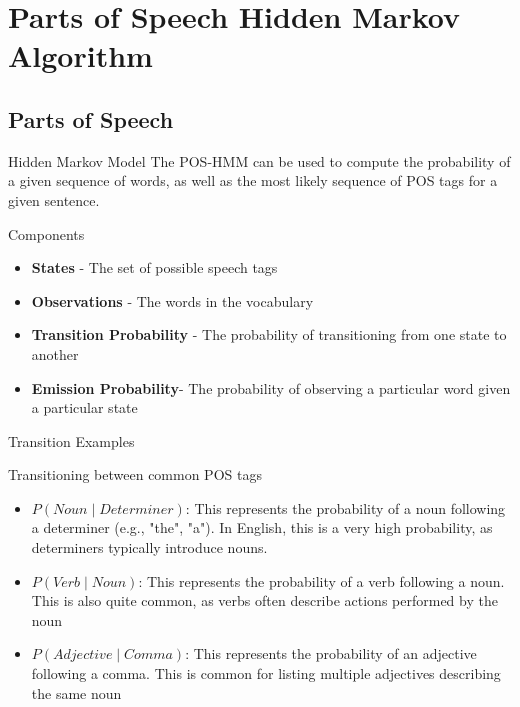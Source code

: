 
    \section{Parts of Speech Hidden Markov Algorithm}
    \subsection{Parts of Speech}
    \begin{frame}{Hidden Markov Model}
       The POS-HMM can be used to compute the probability of a given sequence of words, as well as the most likely sequence of POS tags for a given sentence.

       \begin{block}{Components}
            \begin{itemize}
                \item \textbf{States} - The set of possible speech tags
                \item \textbf{Observations} - The words in the vocabulary
                \item \textbf{Transition Probability} - The probability of transitioning from one state to another
                \item \textbf{Emission Probability}- The probability of observing a particular word given a particular state
            \end{itemize}
       \end{block}
       \end{frame}

       \begin{frame}{Transition Examples}
    \begin{block}{Transitioning between common POS tags}
        \begin{itemize}
            \item $P(Noun \mid Determiner)$: This represents the probability of a noun following a determiner (e.g., "the", "a"). In English, this is a very high probability, as determiners typically introduce nouns.
            \item $P(Verb \mid Noun)$: This represents the probability of a verb following a noun. This is also quite common, as verbs often describe actions performed by the noun
            \item $P(Adjective \mid Comma)$: This represents the probability of an adjective following a comma. This is common for listing multiple adjectives describing the same noun
        \end{itemize}
    \end{block}
    \end{frame}

